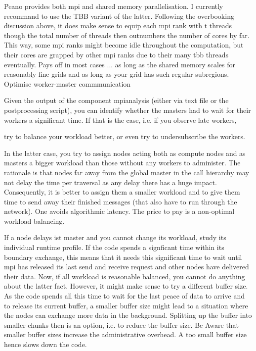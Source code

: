 Peano provides both mpi and shared memory parallelisation. I currently recommand to use the TBB variant of the latter. Following the overbooking discussion above, it does make sense to equip each mpi rank with t threads though the total number of threads then outnumbers the number of cores by far. This way, some mpi ranks might become idle throughout the computation, but their cores are grapped by other mpi ranks due to their many tbb threads eventually. Pays off in most cases ... as long as the shared memory scales for reasonably fine grids and as long as your grid has such regular subregions.
Optimise worker-master commmunication

Given the output of the component mpianalysis (either via text file or the postprocessing script), you can identify whether the masters had to wait for their workers a significant time. If that is the case, i.e. if you observe late workers,

    try to balance your workload better, or
    even try to undersubscribe the workers.

In the latter case, you try to assign nodes acting both as compute nodes and as masters a bigger workload than those without any workers to administer. The rationale is that nodes far away from the global master in the call hierarchy may not delay the time per traversal as any delay there has a huge impact. Consequently, it is better to assign them a smaller workload and to give them time to send away their finished messages (that also have to run through the network). One avoids algorithmic latency. The price to pay is a non-optimal workload balancing.

If a node delays ist master and you cannot change its workload, study its individual runtime profile. If the code spends a signficant time within its boundary exchange, this means that it needs this significant time to wait until mpi has released its last send and receive request and other nodes have delivered their data. Now, if all workload is reasonable balanced, you cannot do anything about the latter fact. However, it might make sense to try a different buffer size. As the code spends all this time to wait for the last peace of data to arrive and to release its current buffer, a smaller buffer size might lead to a situation where the nodes can exchange more data in the background. Splitting up the buffer into smaller chunks then is an option, i.e. to reduce the buffer size. Be Aware that smaller buffer sizes increase the administrative overhead. A too small buffer size hence slows down the code.

